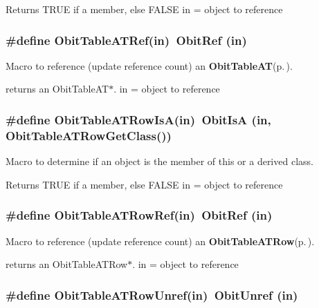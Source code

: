 Returns TRUE if a member, else FALSE in = object to reference 
\subsubsection{\setlength{\rightskip}{0pt plus 5cm}\#define Obit\-Table\-ATRef(in)\ Obit\-Ref (in)}\label{ObitTableAT_8h_a2}


Macro to reference (update reference count) an {\bf Obit\-Table\-AT}{\rm (p.\,\pageref{structObitTableAT})}. 

returns an Obit\-Table\-AT$\ast$. in = object to reference 
\subsubsection{\setlength{\rightskip}{0pt plus 5cm}\#define Obit\-Table\-ATRow\-Is\-A(in)\ Obit\-Is\-A (in, Obit\-Table\-ATRow\-Get\-Class())}\label{ObitTableAT_8h_a6}


Macro to determine if an object is the member of this or a derived class. 

Returns TRUE if a member, else FALSE in = object to reference 
\subsubsection{\setlength{\rightskip}{0pt plus 5cm}\#define Obit\-Table\-ATRow\-Ref(in)\ Obit\-Ref (in)}\label{ObitTableAT_8h_a5}


Macro to reference (update reference count) an {\bf Obit\-Table\-ATRow}{\rm (p.\,\pageref{structObitTableATRow})}. 

returns an Obit\-Table\-ATRow$\ast$. in = object to reference 
\subsubsection{\setlength{\rightskip}{0pt plus 5cm}\#define Obit\-Table\-ATRow\-Unref(in)\ Obit\-Unref (in)}\label{ObitTableAT_8h_a4}


